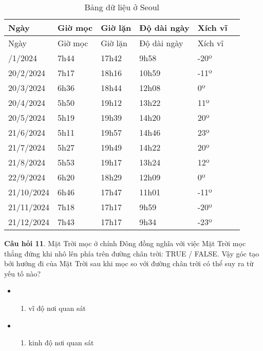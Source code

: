 \documentclass[
  a4paper,
]{book}
\providecommand{\tightlist}{%
  \setlength{\itemsep}{0pt}\setlength{\parskip}{0pt}}
\begin{document}
\begin{longtable}[]{@{}llllll@{}}
\caption{\label{tab:seoul} Bảng dữ liệu ở Seoul}\tabularnewline
\toprule\noalign{}
Ngày & Giờ mọc & Giờ lặn & Độ dài ngày & Xích vĩ & \\
\midrule\noalign{}
\endfirsthead
\toprule\noalign{}
Ngày & Giờ mọc & Giờ lặn & Độ dài ngày & Xích vĩ & \\
\midrule\noalign{}
\endhead
\bottomrule\noalign{}
\endlastfoot
20/1/2024 & 7h44 & 17h42 & 9h58 & -20º & \\
20/2/2024 & 7h17 & 18h16 & 10h59 & -11º & \\
20/3/2024 & 6h36 & 18h44 & 12h08 & 0º & \\
20/4/2024 & 5h50 & 19h12 & 13h22 & 11º & \\
20/5/2024 & 5h19 & 19h39 & 14h20 & 20º & \\
21/6/2024 & 5h11 & 19h57 & 14h46 & 23º & \\
21/7/2024 & 5h27 & 19h49 & 14h22 & 20º & \\
21/8/2024 & 5h53 & 19h17 & 13h24 & 12º & \\
22/9/2024 & 6h20 & 18h29 & 12h09 & 0º & \\
21/10/2024 & 6h46 & 17h47 & 11h01 & -11º & \\
21/11/2024 & 7h18 & 17h17 & 9h59 & -20º & \\
21/12/2024 & 7h43 & 17h17 & 9h34 & -23º & \\
\end{longtable}

\textbf{Câu hỏi 11}. Mặt Trời mọc ở chính Đông đồng nghĩa với việc Mặt Trời mọc thẳng đứng khi nhô lên phía trên đường chân trời: TRUE / FALSE. Vậy góc tạo bởi hướng đi của Mặt Trời sau khi mọc so với đường chân trời có thể suy ra từ yếu tố nào?

\begin{itemize}
\tightlist
\item
  \begin{enumerate}
  \def\labelenumi{(\Alph{enumi})}
  \tightlist
  \item
    vĩ độ nơi quan sát\\
  \end{enumerate}
\item
  \begin{enumerate}
  \def\labelenumi{(\Alph{enumi})}
  \setcounter{enumi}{1}
  \tightlist
  \item
    kinh độ nơi quan sát
  \end{enumerate}
\end{itemize}
\end{document}
